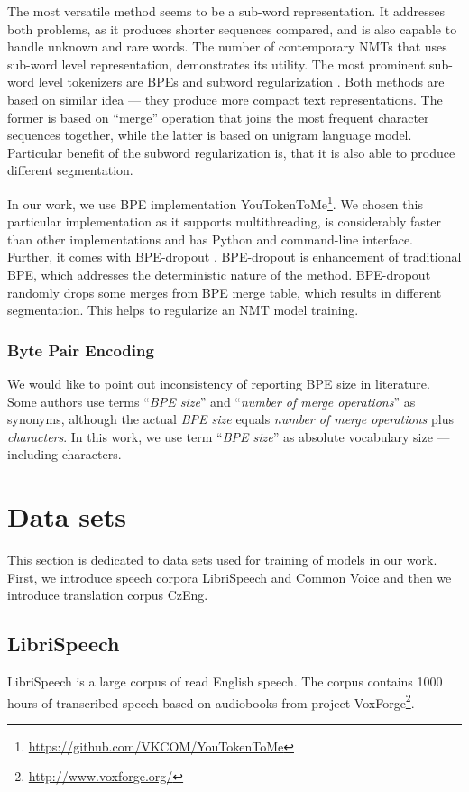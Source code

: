 The most versatile method seems to be a sub-word representation. It addresses both problems, as it produces shorter sequences compared, and is also capable to handle unknown and rare words. The number of contemporary NMTs that uses sub-word level representation, demonstrates its utility. The most prominent sub-word level tokenizers are BPEs  and subword regularization . Both methods are based on similar idea --- they produce more compact text representations. The former is based on ``merge'' operation that joins the most frequent character sequences together, while the latter is based on unigram language model. Particular benefit of the subword regularization is, that it is also able to produce different segmentation.

In our work, we use BPE implementation YouTokenToMe\footnote{\url{https://github.com/VKCOM/YouTokenToMe}}. We chosen this particular implementation as it supports multithreading, is considerably faster than other implementations and has Python and command-line interface. Further, it comes with BPE-dropout . BPE-dropout is enhancement of traditional BPE, which addresses the deterministic nature of the method. BPE-dropout randomly drops some merges from BPE merge table, which results in different segmentation. This helps to regularize an NMT model training.

\subsubsection{Byte Pair Encoding}
We would like to point out inconsistency of reporting BPE size in literature. Some authors use terms ``\textit{BPE size}'' and ``\textit{number of merge operations}'' as synonyms, although the actual \textit{BPE size} equals \textit{number of merge operations} plus \textit{characters}. In this work, we use term ``\textit{BPE size}'' as absolute vocabulary size --- including characters. 

\section{Data sets}
This section is dedicated to data sets used for training of models in our work. First, we introduce speech corpora LibriSpeech and Common Voice and then we introduce translation corpus CzEng.

\subsection{LibriSpeech}
LibriSpeech  is a large corpus of read English speech. The corpus contains 1000 hours of transcribed speech based on audiobooks from project VoxForge\footnote{\url{http://www.voxforge.org/}}.

